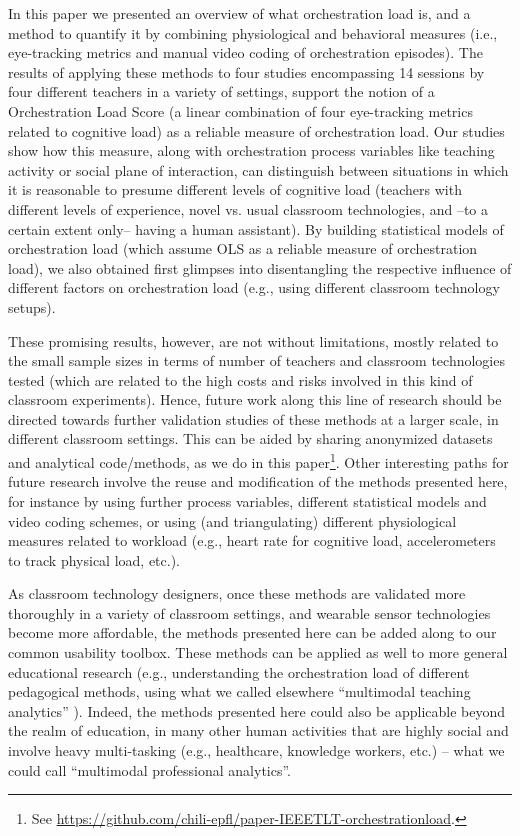 \documentclass[10pt,journal,compsoc]{IEEEtran}
\begin{document}
In this paper we presented an overview of what orchestration load is, and a method to quantify it by combining physiological and behavioral measures (i.e., eye-tracking metrics and manual video coding of orchestration episodes). The results of applying these methods to four studies encompassing 14 sessions by four different teachers in a variety of settings, support the notion of a Orchestration Load Score (a linear combination of four eye-tracking metrics related to cognitive load) as a reliable measure of orchestration load. Our studies show how this measure, along with orchestration process variables like teaching activity or social plane of interaction, can distinguish between situations in which it is reasonable to presume different levels of cognitive load (teachers with different levels of experience, novel vs. usual classroom technologies, and --to a certain extent only-- having a human assistant). By building statistical models of orchestration load (which assume OLS as a reliable measure of orchestration load), we also obtained first glimpses into disentangling the respective influence of different factors on orchestration load (e.g., using different classroom technology setups).

These promising results, however, are not without limitations, mostly related to the small sample sizes in terms of number of teachers and classroom technologies tested (which are related to the high costs and risks involved in this kind of classroom experiments). Hence, future work along this line of research should be directed towards further validation studies of these methods at a larger scale, in different classroom settings. This can be aided by sharing anonymized datasets and analytical code/methods, as we do in this paper\footnote{See \href{https://github.com/chili-epfl/paper-IEEETLT-orchestrationload}{https://github.com/chili-epfl/paper-IEEETLT-orchestrationload}.}. Other interesting paths for future research involve the reuse and modification of the methods presented here, for instance by using further process variables, different statistical models and video coding schemes, or using (and triangulating) different physiological measures related to workload (e.g., heart rate for cognitive load, accelerometers to track physical load, etc.).

As classroom technology designers, once these methods are validated more thoroughly in a variety of classroom settings, and wearable sensor technologies become more affordable, the methods presented here can be added along to our common usability toolbox. These methods can be applied as well to more general educational research (e.g., understanding the orchestration load of different pedagogical methods, using what we called elsewhere ``multimodal teaching analytics'' \cite{prieto2016teaching}). Indeed, the methods presented here could also be applicable beyond the realm of education, in many other human activities that are highly social and involve heavy multi-tasking (e.g., healthcare, knowledge workers, etc.) -- what we could call ``multimodal professional analytics''.
\end{document}
